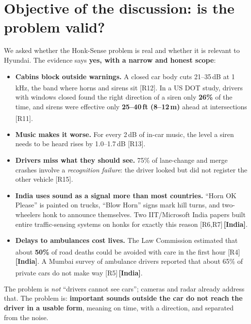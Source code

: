 \documentclass[11pt]{article}
\newcommand{\IN}{{\color{sky}\bfseries[India]}}
\newcommand{\chk}{\textsuperscript{\color{alert}\dag}}
\renewcommand{\cite}[1]{{\color{navy}[#1]}}
\begin{document}
\section{Objective of the discussion: is the problem valid?}
We asked whether the Honk-Sense problem is real and whether it is relevant to Hyundai. The evidence says \textbf{yes, with a narrow and honest scope}:
\begin{itemize}[leftmargin=*]
  \item \textbf{Cabins block outside warnings.} A closed car body cuts 21--35\,dB at 1\,kHz, the band where horns and sirens sit \cite{R12}\chk. In a US DOT study, drivers with windows closed found the right direction of a siren only \textbf{26\%} of the time, and sirens were effective only \textbf{25--40\,ft (8--12\,m)} ahead at intersections \cite{R11}\chk.
  \item \textbf{Music makes it worse.} For every 2\,dB of in-car music, the level a siren needs to be heard rises by 1.0--1.7\,dB \cite{R13}.
  \item \textbf{Drivers miss what they should see.} 75\% of lane-change and merge crashes involve a \emph{recognition failure}: the driver looked but did not register the other vehicle \cite{R15}.
  \item \textbf{India uses sound as a signal more than most countries.} ``Horn OK Please'' is painted on trucks, ``Blow Horn'' signs mark hill turns, and two-wheelers honk to announce themselves. Two IIT/Microsoft India papers built entire traffic-sensing systems on honks for exactly this reason \cite{R6,R7}\,\IN.
  \item \textbf{Delays to ambulances cost lives.} The Law Commission estimated that about \textbf{50\%} of road deaths could be avoided with care in the first hour \cite{R4}\chk\,\IN. A Mumbai survey of ambulance drivers reported that about 65\% of private cars do not make way \cite{R5}\chk\,\IN.
\end{itemize}
The problem is \emph{not} ``drivers cannot see cars''; cameras and radar already address that. The problem is: \textbf{important sounds outside the car do not reach the driver in a usable form}, meaning on time, with a direction, and separated from the noise.

\end{document}
